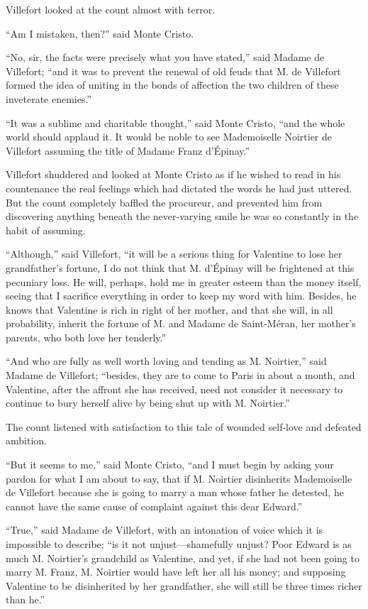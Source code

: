 Villefort looked at the count almost with terror.

“Am I mistaken, then?” said Monte Cristo.

“No, sir, the facts were precisely what you have stated,” said Madame
de Villefort; “and it was to prevent the renewal of old feuds that M.
de Villefort formed the idea of uniting in the bonds of affection the
two children of these inveterate enemies.”

“It was a sublime and charitable thought,” said Monte Cristo, “and the
whole world should applaud it. It would be noble to see Mademoiselle
Noirtier de Villefort assuming the title of Madame Franz d’Épinay.”

Villefort shuddered and looked at Monte Cristo as if he wished to read
in his countenance the real feelings which had dictated the words he
had just uttered. But the count completely baffled the procureur, and
prevented him from discovering anything beneath the never-varying smile
he was so constantly in the habit of assuming.

“Although,” said Villefort, “it will be a serious thing for Valentine
to lose her grandfather’s fortune, I do not think that M. d’Épinay will
be frightened at this pecuniary loss. He will, perhaps, hold me in
greater esteem than the money itself, seeing that I sacrifice
everything in order to keep my word with him. Besides, he knows that
Valentine is rich in right of her mother, and that she will, in all
probability, inherit the fortune of M. and Madame de Saint-Méran, her
mother’s parents, who both love her tenderly.”

“And who are fully as well worth loving and tending as M. Noirtier,”
said Madame de Villefort; “besides, they are to come to Paris in about
a month, and Valentine, after the affront she has received, need not
consider it necessary to continue to bury herself alive by being shut
up with M. Noirtier.”

The count listened with satisfaction to this tale of wounded self-love
and defeated ambition.

“But it seems to me,” said Monte Cristo, “and I must begin by asking
your pardon for what I am about to say, that if M. Noirtier disinherits
Mademoiselle de Villefort because she is going to marry a man whose
father he detested, he cannot have the same cause of complaint against
this dear Edward.”

“True,” said Madame de Villefort, with an intonation of voice which it
is impossible to describe; “is it not unjust—shamefully unjust? Poor
Edward is as much M. Noirtier’s grandchild as Valentine, and yet, if
she had not been going to marry M. Franz, M. Noirtier would have left
her all his money; and supposing Valentine to be disinherited by her
grandfather, she will still be three times richer than he.”

